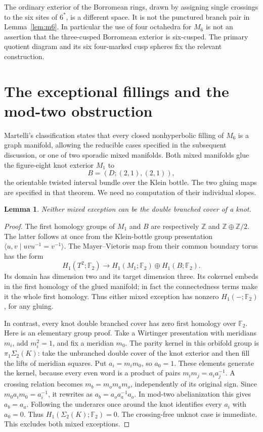 \documentclass[11pt]{article}
\newtheorem{lemma}[theorem]{Lemma}
\newcommand{\F}{\mathbb F}
\newcommand{\Sig}{\Sigma_2}
\begin{document}
The ordinary exterior of the Borromean rings, drawn by assigning
single crossings to the six sites of $6^*$, is a different space.
It is not the punctured branch pair in Lemma~\ref{lem:m6}.
In particular the use of four octahedra for $M_6$ is not an assertion
that the three-cusped Borromean exterior is six-cusped.
The primary quotient diagram and its six four-marked cusp spheres
fix the relevant construction.

\section{The exceptional fillings and the mod-two obstruction}

Martelli's classification \cite[Theorem~2.7, printed pp.~15--16]{mar}
states that every closed nonhyperbolic filling of $M_6$ is a graph
manifold, allowing the reducible cases specified in the subsequent
discussion, or one of two sporadic mixed manifolds.
Both mixed manifolds glue the figure-eight knot exterior $M_1$ to
\[
                      B=(D;(2,1),(2,1)),
\]
the orientable twisted interval bundle over the Klein bottle.
The two gluing maps are specified in that theorem.
We need no computation of their individual slopes.

\begin{lemma}\label{lem:modtwo}
Neither mixed exception can be the double branched cover of a knot.
\end{lemma}
\begin{proof}
The first homology groups of $M_1$ and $B$ are respectively
$\mathbb Z$ and $\mathbb Z\oplus\mathbb Z/2$.
The latter follows at once from the Klein-bottle group presentation
$\langle u,v\mid uvu^{-1}=v^{-1}\rangle$.
The Mayer--Vietoris map from their common boundary torus has the form
\[
 H_1(T^2;\F_2)\longrightarrow
 H_1(M_1;\F_2)\oplus H_1(B;\F_2).
\]
Its domain has dimension two and its target dimension three.
Its cokernel embeds in the first homology of the glued manifold;
in fact the connectedness terms make it the whole first homology.
Thus either mixed exception has nonzero $H_1(-;\F_2)$, for any gluing.

In contrast, every knot double branched cover has zero first
homology over $\F_2$. Here is an elementary group proof.
Take a Wirtinger presentation with meridians $m_i$, add $m_i^2=1$,
and fix a meridian $m_0$. The parity kernel in this orbifold group
is $\pi_1\Sig(K)$: take the unbranched double cover of the knot
exterior and then fill the lifts of meridian squares.
Put $a_i=m_i m_0$, so $a_0=1$.
These elements generate the kernel, because every even word is a
product of pairs $m_i m_j=a_i a_j^{-1}$.
A crossing relation becomes $m_b=m_o m_a m_o$, independently of its
original sign. Since $m_0a_i m_0=a_i^{-1}$, it rewrites as
$a_b=a_o a_a^{-1}a_o$.
In mod-two abelianization this gives $a_b=a_a$.
Following the underarcs once around the knot identifies every
$a_i$ with $a_0=0$. Thus $H_1(\Sig(K);\F_2)=0$.
The crossing-free unknot case is immediate.
This excludes both mixed exceptions.
\end{proof}
\end{document}
